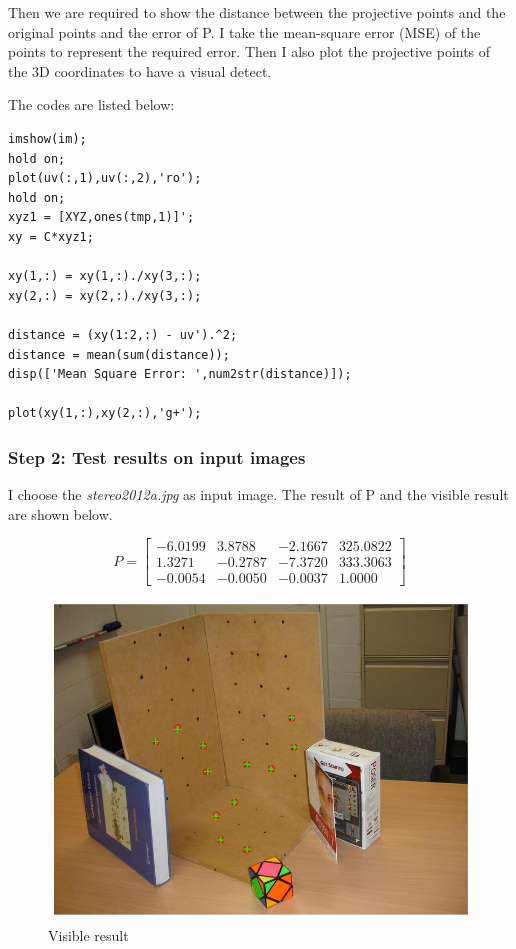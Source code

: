 \documentclass{article}
\begin{document}
Then we are required to show the distance between the projective points and the original points and the error of P. I take the mean-square error (MSE) of the points to represent the required error. Then I also plot the projective points of the 3D coordinates to have a visual detect.

The codes are listed below:

\begin{lstlisting}
imshow(im);
hold on;
plot(uv(:,1),uv(:,2),'ro');
hold on;
xyz1 = [XYZ,ones(tmp,1)]';
xy = C*xyz1;

xy(1,:) = xy(1,:)./xy(3,:);
xy(2,:) = xy(2,:)./xy(3,:);

distance = (xy(1:2,:) - uv').^2;
distance = mean(sum(distance));
disp(['Mean Square Error: ',num2str(distance)]);

plot(xy(1,:),xy(2,:),'g+');
\end{lstlisting}

\subsubsection*{Step 2: Test results on input images}

I choose the \emph{stereo2012a.jpg} as input image. The result of P and the visible result are shown below. 

$$P = \left[ \begin{array}{cccc} -6.0199 & 3.8788 & -2.1667 & 325.0822 \\ 1.3271 & -0.2787 & -7.3720 & 333.3063 \\ -0.0054 & -0.0050 & -0.0037 & 1.0000 \end{array} \right] $$

\begin{figure}[htbp]
    \centering
    \includegraphics[scale = 0.35]{fig22.jpg}
    \caption{Visible result}
    \label{fig19}
\end{figure}
\end{document}
